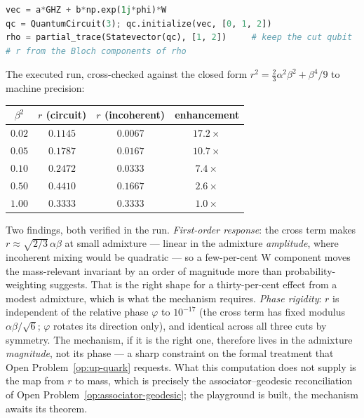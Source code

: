 \begin{lstlisting}[language=Python,basicstyle=\small\ttfamily]
vec = a*GHZ + b*np.exp(1j*phi)*W
qc = QuantumCircuit(3); qc.initialize(vec, [0, 1, 2])
rho = partial_trace(Statevector(qc), [1, 2])     # keep the cut qubit
# r from the Bloch components of rho
\end{lstlisting}

The executed run, cross-checked against the closed form
$r^2 = \tfrac23\alpha^2\beta^2 + \beta^4/9$ to machine precision:
\begin{center}
\begin{tabular}{cccc}
\hline
$\beta^2$ & $r$ (circuit) & $r$ (incoherent) & enhancement \\
\hline
$0.02$ & $0.1145$ & $0.0067$ & $17.2\times$ \\
$0.05$ & $0.1787$ & $0.0167$ & $10.7\times$ \\
$0.10$ & $0.2472$ & $0.0333$ & $7.4\times$ \\
$0.50$ & $0.4410$ & $0.1667$ & $2.6\times$ \\
$1.00$ & $0.3333$ & $0.3333$ & $1.0\times$ \\
\hline
\end{tabular}
\end{center}
Two findings, both verified in the run. \emph{First-order response}: the cross term makes
$r \approx \sqrt{2/3}\,\alpha\beta$ at small admixture --- linear in the admixture
\emph{amplitude}, where incoherent mixing would be quadratic --- so a few-per-cent W component
moves the mass-relevant invariant by an order of magnitude more than probability-weighting
suggests. That is the right shape for a thirty-per-cent effect from a modest admixture, which is
what the mechanism requires. \emph{Phase rigidity}: $r$ is independent of the relative phase
$\varphi$ to $10^{-17}$ (the cross term has fixed modulus $\alpha\beta/\sqrt6$; $\varphi$ rotates
its direction only), and identical across all three cuts by symmetry. The mechanism, if it is the
right one, therefore lives in the admixture \emph{magnitude}, not its phase --- a sharp constraint
on the formal treatment that Open Problem~\ref{op:up-quark} requests. What this computation does
not supply is the map from $r$ to mass, which is precisely the associator--geodesic reconciliation
of Open Problem~\ref{op:associator-geodesic}; the playground is built, the mechanism awaits its
theorem.

